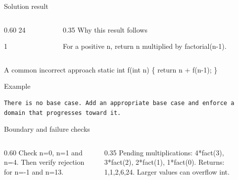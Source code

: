 \documentclass[10pt,aspectratio=169]{beamer}
\begin{document}
\begin{frame}[fragile,t]{Solution result}
\begin{columns}[T,onlytextwidth]\begin{column}{0.60\textwidth}
24\par 1
\end{column}\begin{column}{0.35\textwidth}\small
Why this result follows

For a positive n, return n multiplied by factorial(n-1).
\end{column}\end{columns}
\end{frame}

\begin{frame}[fragile,t]{A common incorrect approach}
static int f(int n) \{ return n + f(n-1); \}
\vspace{1mm}\begin{block}{Example}
\begin{lstlisting}
There is no base case. Add an appropriate base case and enforce a domain that progresses toward it.
\end{lstlisting}
\end{block}
\end{frame}

\begin{frame}[fragile,t]{Boundary and failure checks}
\begin{columns}[T,onlytextwidth]\begin{column}{0.60\textwidth}
Check n=0, n=1 and n=4. Then verify rejection for n=-1 and n=13.
\end{column}\begin{column}{0.35\textwidth}\small
Pending multiplications: 4*fact(3), 3*fact(2), 2*fact(1), 1*fact(0). Returns: 1,1,2,6,24. Larger values can overflow int.
\end{column}\end{columns}
\end{frame}
\end{document}
